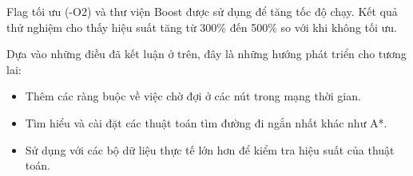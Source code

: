 \documentclass[../main.tex]{subfiles}
\begin{document}
Flag tối ưu (-O2) và thư viện Boost được sử dụng để tăng tốc độ chạy. Kết quả thử nghiệm cho thấy hiệu suất tăng từ 300\% đến 500\% so với khi không tối ưu. 

Dựa vào những điều đã kết luận ở trên, đây là những hướng phát triển cho tương lai:

\begin{itemize}
    \item Thêm các ràng buộc về việc chờ đợi ở các nút trong mạng thời gian.
    \item Tìm hiểu và cài đặt các thuật toán tìm đường đi ngắn nhất khác như A*.
    \item Sử dụng với các bộ dữ liệu thực tế lớn hơn để kiểm tra hiệu suất của thuật toán.
\end{itemize}
\end{document}
